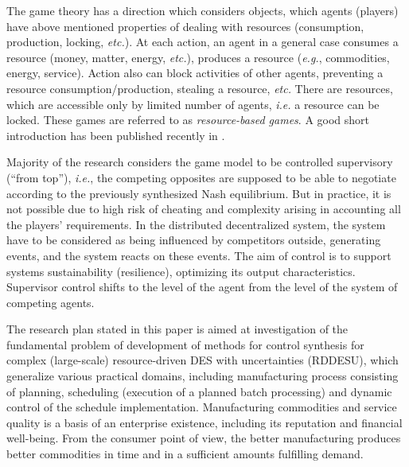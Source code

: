 \documentclass[conference,a4paper]{IEEEtran}
\begin{document}

The game theory has a direction which considers objects, which agents (players) have above mentioned properties of dealing with resources (consumption, production, locking, \emph{etc.}).  At each action, an agent in a general case consumes a resource (money, matter, energy, \emph{etc.}), produces a resource (\emph{e.g.}, commodities, energy, service).  Action also can block activities of other agents, preventing a resource consumption/production, stealing a resource, \emph{etc.}  There are resources, which are accessible only by limited number of agents, \emph{i.e.} a resource can be locked. These games are referred to as \emph{resource-based games}. A good short introduction has been published recently in \cite{rbg}.

Majority of the research considers the game model to be controlled supervisory (``from top''), \emph{i.e.}, the competing opposites are supposed to be able to negotiate according to the previously synthesized Nash equilibrium. But in practice, it is not possible due to high risk of cheating and complexity arising in accounting all the players’ requirements. In the distributed decentralized system, the system have to be considered as being influenced by competitors outside, generating events, and the system reacts on these events. The aim of control is to support systems sustainability (resilience), optimizing its output characteristics. Supervisor control shifts to the level of the agent from the level of the system of competing agents. %

The research plan stated in this paper is aimed at investigation of the fundamental problem of development of methods for control synthesis for complex (large-scale) resource-driven DES with uncertainties (RDDESU), which generalize various practical domains, including manufacturing process consisting of planning, scheduling (execution of a planned batch processing) and dynamic control of the schedule implementation.  Manufacturing commodities and service quality is a basis of an enterprise existence, including its reputation and financial well-being. From the consumer point of view, the better manufacturing produces better commodities in time and in a sufficient amounts fulfilling demand.
\end{document}
